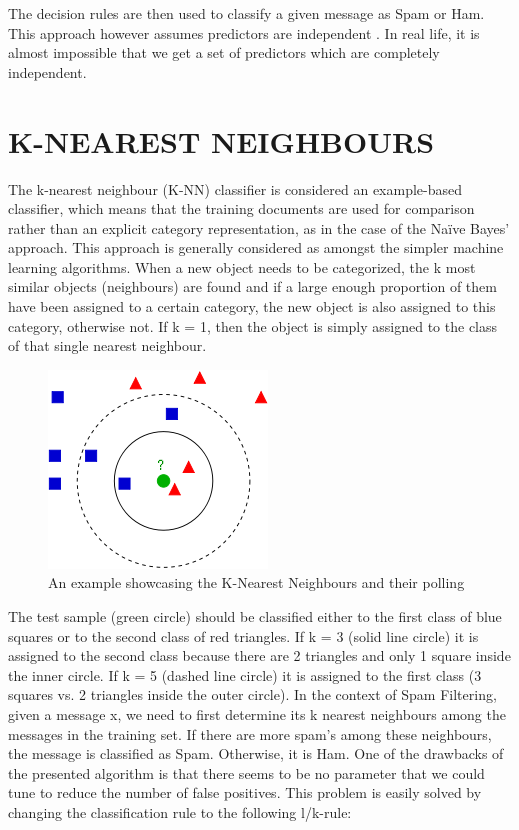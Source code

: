The decision rules are then used to classify a given message as Spam or Ham. This approach however assumes predictors are independent \citep{2}. In real life, it is almost impossible that we get a set of predictors which are completely independent.

\section{K-NEAREST NEIGHBOURS}
The k-nearest neighbour (K-NN) classifier is considered an example-based classifier, which means that the training documents are used for comparison rather than an explicit category representation, as in the case of the Naïve Bayes’ approach. This approach is generally considered as amongst the simpler machine learning algorithms.
When a new object needs to be categorized, the k most similar objects (neighbours) are found and if a large enough proportion of them have been assigned to a certain category, the new object is also assigned to this category, otherwise not.\citep{3} If k = 1, then the object is simply assigned to the class of that single nearest neighbour. 

\begin{figure}[h]
\centering\includegraphics[width=0.75\linewidth]{knn.png}\caption{An example showcasing the K-Nearest Neighbours and their polling}
\end{figure}

The test sample (green circle) should be classified either to the first class of blue squares or to the second class of red triangles. If k = 3 (solid line circle) it is assigned to the second class because there are 2 triangles and only 1 square inside the inner circle. If k = 5 (dashed line circle) it is assigned to the first class (3 squares vs. 2 triangles inside the outer circle).
In the context of Spam Filtering, given a message x, we need to first determine its k nearest neighbours among the messages in the training set. If there are more spam's among these neighbours, the message is classified as Spam. Otherwise, it is Ham.
One of the drawbacks of the presented algorithm is that there seems to be no parameter that we could tune to reduce the number of false positives. This problem is easily solved by changing the classification rule to the following l/k-rule:

